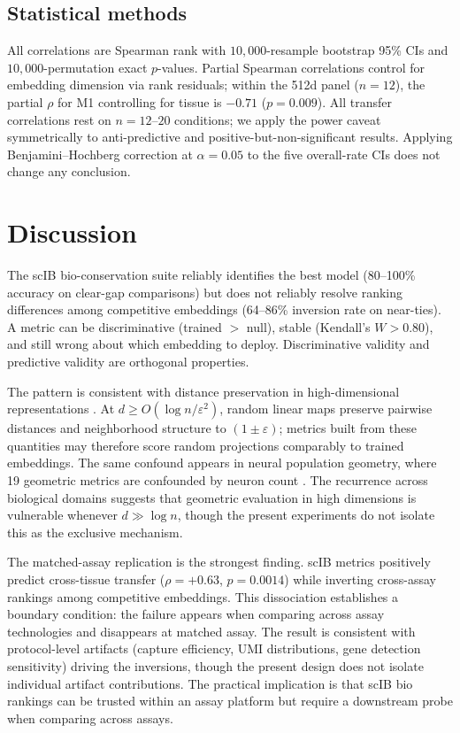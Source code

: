 \documentclass[11pt]{article}
\begin{document}
\subsection{Statistical methods}

All correlations are Spearman rank with $10{,}000$-resample bootstrap 95\% CIs and $10{,}000$-permutation exact $p$-values. Partial Spearman correlations control for embedding dimension via rank residuals; within the 512d panel ($n = 12$), the partial $\rho$ for M1 controlling for tissue is $-0.71$ ($p = 0.009$). All transfer correlations rest on $n = 12$--$20$ conditions; we apply the power caveat symmetrically to anti-predictive and positive-but-non-significant results. Applying Benjamini--Hochberg correction at $\alpha = 0.05$ to the five overall-rate CIs does not change any conclusion.


\section{Discussion}
\label{sec:discussion}

The scIB bio-conservation suite reliably identifies the best model (80--100\% accuracy on clear-gap comparisons) but does not reliably resolve ranking differences among competitive embeddings (64--86\% inversion rate on near-ties). A metric can be discriminative (trained $>$ null), stable (Kendall's $W > 0.80$), and still wrong about which embedding to deploy. Discriminative validity and predictive validity are orthogonal properties.

The pattern is consistent with distance preservation in high-dimensional representations \citep{johnsonlindenstrauss1984}. At $d \geq O(\log n / \varepsilon^2)$, random linear maps preserve pairwise distances and neighborhood structure to $(1 \pm \varepsilon)$; metrics built from these quantities may therefore score random projections comparably to trained embeddings. The same confound appears in neural population geometry, where 19 geometric metrics are confounded by neuron count \citep{tower2026bracket}. The recurrence across biological domains suggests that geometric evaluation in high dimensions is vulnerable whenever $d \gg \log n$, though the present experiments do not isolate this as the exclusive mechanism.

The matched-assay replication is the strongest finding. scIB metrics positively predict cross-tissue transfer ($\rho = +0.63$, $p = 0.0014$) while inverting cross-assay rankings among competitive embeddings. This dissociation establishes a boundary condition: the failure appears when comparing across assay technologies and disappears at matched assay. The result is consistent with protocol-level artifacts (capture efficiency, UMI distributions, gene detection sensitivity) driving the inversions, though the present design does not isolate individual artifact contributions. The practical implication is that scIB bio rankings can be trusted within an assay platform but require a downstream probe when comparing across assays.
\end{document}
